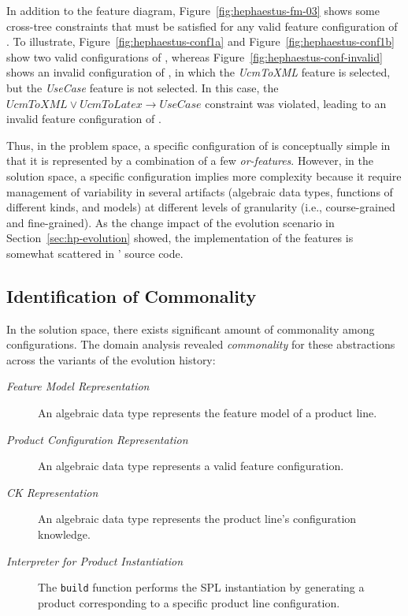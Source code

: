 
In addition to the feature diagram, Figure~\ref{fig:hephaestus-fm-03} shows some cross-tree constraints that must be satisfied for any valid feature configuration of \hpl.  To illustrate, Figure~\ref{fig:hephaestus-conf1a} and Figure~\ref{fig:hephaestus-conf1b} show two valid configurations of \hpl, whereas Figure~\ref{fig:hephaestus-conf-invalid} shows an invalid configuration of \hpl, in which the \emph{UcmToXML} feature is selected, but the \emph{UseCase} feature is not selected. In this case, the $UcmToXML \lor UcmToLatex \rightarrow Use Case$ constraint was violated, leading to an invalid feature configuration of \hpl.

Thus, in the problem space, a specific configuration of \hp{} is conceptually simple in that it is represented by a combination of a few \textit{or-features}. However, in the solution space, a specific configuration implies more complexity because it require management of variability in several artifacts (algebraic data types, functions of different kinds, and models) at different levels of granularity (i.e., course-grained and fine-grained). As the change impact of the evolution scenario in Section~\ref{sec:hp-evolution} showed, the implementation of the features is somewhat scattered in \hp' source code.


\subsection{Identification of Commonality} 
\label{sec:commonality}

In the solution space, there exists significant amount of commonality among configurations. 
The domain analysis revealed \emph{commonality} for these abstractions across the variants of the evolution history:

\begin{description}

\item[\emph{Feature Model Representation}] An algebraic data type represents the feature model of a product line.
  
\item[\emph{Product Configuration Representation}] An algebraic data type represents a valid feature configuration.

\item[\emph{CK Representation}] An algebraic data type represents the product line's configuration knowledge.

\item[\emph{Interpreter for Product Instantiation}] The \texttt{build} function performs the SPL instantiation by generating a product corresponding to a specific product line configuration.

\end{description}

